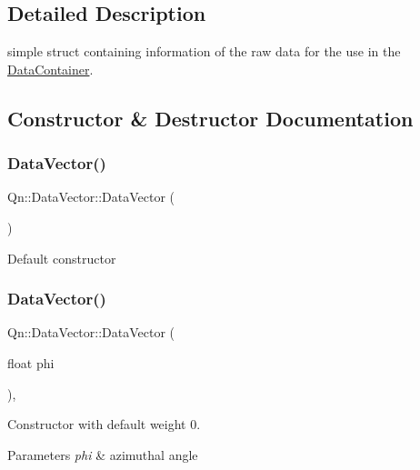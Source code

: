 \subsection{Detailed Description}
simple struct containing information of the raw data for the use in the \mbox{\hyperlink{classQn_1_1DataContainer}{Data\+Container}}. 

\subsection{Constructor \& Destructor Documentation}
\mbox{\label{structQn_1_1DataVector_a84d4d8bae550f4a73bf08fbb63912872}} 
\subsubsection{\texorpdfstring{Data\+Vector()}{DataVector()}\hspace{0.1cm}{\footnotesize\ttfamily [1/3]}}
{\footnotesize\ttfamily Qn\+::\+Data\+Vector\+::\+Data\+Vector (\begin{DoxyParamCaption}{ }\end{DoxyParamCaption})\hspace{0.3cm}{\ttfamily [default]}}

Default constructor \mbox{\label{structQn_1_1DataVector_a2b64b793e5e060ff50fdce74f87e1be9}} 
\subsubsection{\texorpdfstring{Data\+Vector()}{DataVector()}\hspace{0.1cm}{\footnotesize\ttfamily [2/3]}}
{\footnotesize\ttfamily Qn\+::\+Data\+Vector\+::\+Data\+Vector (\begin{DoxyParamCaption}\item[{float}]{phi }\end{DoxyParamCaption})\hspace{0.3cm}{\ttfamily [inline]}, {\ttfamily [explicit]}}

Constructor with default weight 0. 
\begin{DoxyParams}{Parameters}
{\em phi} & azimuthal angle \\
\hline
\end{DoxyParams}
\mbox{\label{structQn_1_1DataVector_a41d789d2340f18aebfa6e2256c7a7f13}} 
